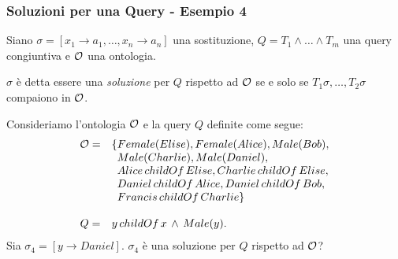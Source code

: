 \documentclass[8pt]{beamer}
\begin{document}
\begin{frame}
\frametitle{Soluzioni per una Query - Esempio 4}
Siano $\sigma=[x_1 \rightarrow a_1, \ldots, x_n \rightarrow a_n]$ una sostituzione,
$Q=T_1 \wedge \ldots \wedge T_m$ una query congiuntiva e $\mathcal{O}$ una ontologia.
\vspace{\baselineskip}

$\sigma$ \`e detta essere una \emph{soluzione} per $Q$ rispetto ad $\mathcal{O}$ se
e solo se $T_1\sigma, \ldots, T_2\sigma$ compaiono in $\mathcal{O}$. 
\vspace{\baselineskip}

Consideriamo l'ontologia $\mathcal{O}$ e la query $Q$ definite come segue:
\[
\begin{array}{cl}
  \Ont  =  &  \{Female(Elise), Female(Alice), Male(Bob), \\
  &\phantom{\{}Male(Charlie), Male(Daniel), \\
  &\phantom{\{}Alice\,childOf\,Elise, Charlie\,childOf\,Elise, \\
  &\phantom{\{}Daniel\,childOf\,Alice, Daniel\,childOf\,Bob, \\
  &\phantom{\{}Francis\,childOf\,Charlie \}\\
  &\\
  Q = & y\,childOf\,x\,\wedge\,Male(y) .
 \end{array}
\]
Sia $\sigma_4=[y \rightarrow Daniel]$. $\sigma_4$ \`e una soluzione per $Q$
rispetto ad $\mathcal{O}$?
\phantom{Affinch\`e una sostituzione $\sigma$ sia una soluzione per una query $Q$
(a prescindere dall'ontologia) \`e necessario che in $\sigma$ compaiano
tutte le variabili di $Q$.}
\end{frame}
\end{document}
